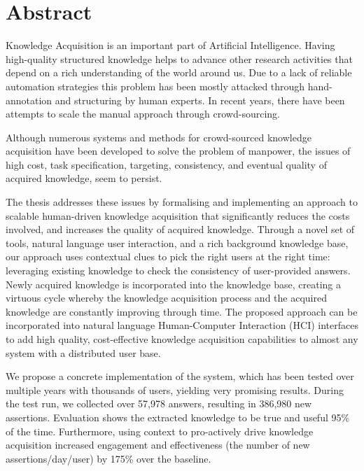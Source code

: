 % 
\chapter*{Abstract}

Knowledge Acquisition is an important part of Artificial Intelligence. Having high-quality structured knowledge helps to advance other research activities that depend on a rich understanding of the world around us. Due to a lack of reliable automation strategies this problem has been mostly attacked through hand-annotation and structuring by human experts. In recent years, there have been attempts to scale the manual approach through crowd-sourcing.

Although numerous systems and methods for crowd-sourced knowledge acquisition have been developed to solve the problem of manpower, the issues of high cost, task specification, targeting, consistency, and eventual quality of acquired knowledge, seem to persist.

The thesis addresses these issues by formalising and implementing an approach to scalable human-driven knowledge acquisition that significantly reduces the costs involved, and increases the quality of acquired knowledge. Through a novel set of tools, natural language user interaction, and a rich background knowledge base, our approach uses contextual clues to pick the right users at the right time: leveraging existing knowledge to check the consistency of user-provided answers. Newly acquired knowledge is incorporated into the knowledge base, creating a virtuous cycle whereby the knowledge acquisition process and the acquired knowledge are constantly improving through time. The proposed approach can be incorporated into natural language Human-Computer Interaction (HCI) interfaces to add high quality, cost-effective knowledge acquisition capabilities to almost any system with a distributed user base.

We propose a concrete implementation of the system, which has been tested over multiple years with thousands of users, yielding very promising results. During the test run, we collected over 57,978 answers, resulting in 386,980 new assertions. Evaluation shows the extracted knowledge to be true and useful 95\% of the time. Furthermore, using context to pro-actively drive knowledge acquisition increased engagement and effectiveness (the number of new assertions/day/user) by 175\% over the baseline.